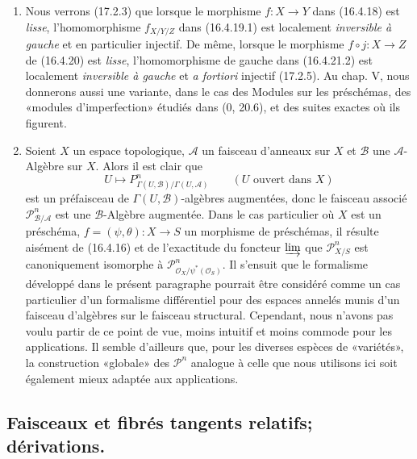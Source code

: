 \begin{remarks}[16.4.24]
\label{IV.16.4.24}
\begin{enumerate}
\item[(i)] Nous verrons (17.2.3) que lorsque le morphisme $f:X\to Y$ dans
(16.4.18) est \emph{lisse}, l'homomorphisme $f_{X/Y/Z}$ dans (16.4.19.1) est
localement \emph{inversible à gauche} et en particulier injectif. De même,
lorsque le morphisme $f\circ j:X\to Z$ de (16.4.20) est \emph{lisse},
l'homomorphisme de gauche dans (16.4.21.2) est localement
\emph{inversible à gauche} et \emph{a fortiori} injectif (17.2.5). Au chap. V,
nous donnerons aussi une variante, dans le cas des Modules sur les
préschémas, des «modules d'imperfection» étudiés dans (0, 20.6), et des suites
exactes où ils figurent.

\item[(ii)] Soient $X$ un espace topologique, $\mathscr{A}$ un faisceau
d'anneaux sur $X$ et $\mathscr{B}$ une $\mathscr{A}$-Algèbre sur $X$. Alors il
est clair que
\[
  U\longmapsto
  P_{\Gamma(U,\mathscr{B})/\Gamma(U,\mathscr{A})}^n
  \qquad (U\text{ ouvert dans }X)
\]
est un préfaisceau de $\Gamma(U,\mathscr{B})$-algèbres augmentées, donc le
faisceau associé $\mathscr{P}_{\mathscr{B}/\mathscr{A}}^n$ est une
$\mathscr{B}$-Algèbre augmentée. Dans le cas particulier où $X$ est un
préschéma, $f=(\psi,\theta):X\to S$ un morphisme de préschémas, il résulte
aisément de (16.4.16) et de l'exactitude du foncteur $\varinjlim$ que
$\mathscr{P}_{X/S}^n$ est canoniquement isomorphe à
$\mathscr{P}_{\mathcal{O}_X/\psi^*(\mathcal{O}_S)}^n$. Il s'ensuit que le
formalisme développé dans le présent paragraphe pourrait être considéré comme
un
cas particulier d'un formalisme différentiel pour des espaces annelés munis
d'un faisceau d'algèbres sur le faisceau structural. Cependant, nous n'avons
pas voulu partir de ce point de vue, moins intuitif et moins commode pour les
applications. Il semble d'ailleurs que, pour les diverses espèces de
«variétés», la construction «globale» des $\mathscr{P}^n$ analogue à celle que
nous utilisons ici soit également mieux adaptée aux applications.
\end{enumerate}
\end{remarks}

\subsection{Faisceaux et fibrés tangents relatifs; dérivations.}

